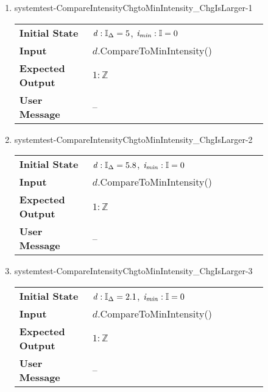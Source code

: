 \begin{enumerate}
    \item{systemtest-CompareIntensityChgtoMinIntensity\_ChgIsLarger-1}
    \begin{table}[H]
        \centering
        \begin{tabular}{P{0.25\linewidth}P{0.6\linewidth}}
            \toprule
            \textbf{Initial State} & $\mathit{d} : \mathbb{I}_{\Delta} = 5$,
            $\mathit{i_{min}} : \mathbb{I} = 0$ \\
            \textbf{Input} & $\mathit{d}$.CompareToMinIntensity() \\ \midrule
            \textbf{Expected Output} & $1 : \mathbb{Z}$ \\
            \textbf{User Message} & -- \\ \bottomrule
        \end{tabular}
    \end{table}

    \item{systemtest-CompareIntensityChgtoMinIntensity\_ChgIsLarger-2}
    \begin{table}[H]
        \centering
        \begin{tabular}{P{0.25\linewidth}P{0.6\linewidth}}
            \toprule
            \textbf{Initial State} & $\mathit{d} : \mathbb{I}_{\Delta} = 5.8$,
            $\mathit{i_{min}} : \mathbb{I} = 0$ \\
            \textbf{Input} & $\mathit{d}$.CompareToMinIntensity() \\ \midrule
            \textbf{Expected Output} & $1 : \mathbb{Z}$ \\
            \textbf{User Message} & -- \\ \bottomrule
        \end{tabular}
    \end{table}

    \item{systemtest-CompareIntensityChgtoMinIntensity\_ChgIsLarger-3}
    \begin{table}[H]
        \centering
        \begin{tabular}{P{0.25\linewidth}P{0.6\linewidth}}
            \toprule
            \textbf{Initial State} & $\mathit{d} : \mathbb{I}_{\Delta} = 2.1$,
            $\mathit{i_{min}} : \mathbb{I} = 0$ \\
            \textbf{Input} & $\mathit{d}$.CompareToMinIntensity() \\ \midrule
            \textbf{Expected Output} & $1 : \mathbb{Z}$ \\
            \textbf{User Message} & -- \\ \bottomrule
        \end{tabular}
    \end{table}


\end{enumerate}
